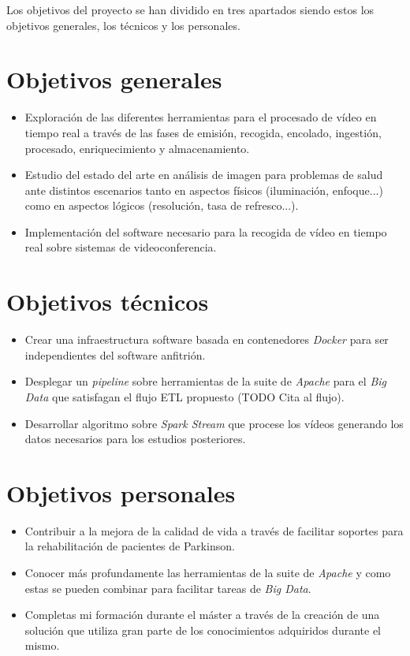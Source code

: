Los objetivos del proyecto se han dividido en tres apartados siendo estos los objetivos generales, los técnicos y los personales.

\section{Objetivos generales}

\begin{itemize}
	\item Exploración de las diferentes herramientas para el procesado de vídeo en tiempo real a través de las fases de emisión, recogida, encolado, ingestión, procesado, enriquecimiento y almacenamiento.
	\item Estudio del estado del arte en análisis de imagen para problemas de salud ante distintos escenarios tanto en aspectos físicos (iluminación, enfoque...) como en aspectos lógicos (resolución, tasa de refresco...).
	\item Implementación del software necesario para la recogida de vídeo en tiempo real sobre sistemas de videoconferencia.
\end{itemize}

\section{Objetivos técnicos}

\begin{itemize}
	\item Crear una infraestructura software basada en contenedores \textit{Docker} para ser independientes del software anfitrión.
	\item Desplegar un \textit{pipeline} sobre herramientas de la suite de \textit{Apache} para el \textit{Big Data} que satisfagan el flujo ETL propuesto (TODO Cita al flujo).
	\item Desarrollar algoritmo sobre \textit{Spark Stream} que procese los vídeos generando los datos necesarios para los estudios posteriores. 
\end{itemize}


\section{Objetivos personales}

\begin{itemize}
	\item Contribuir a la mejora de la calidad de vida a través de facilitar soportes para la rehabilitación de pacientes de Parkinson.
	\item Conocer más profundamente las herramientas de la suite de \textit{Apache} y como estas se pueden combinar para facilitar tareas de \textit{Big Data}.
	\item Completas mi formación durante el máster a través de la creación de una solución que utiliza gran parte de los conocimientos adquiridos durante el mismo.
\end{itemize}

